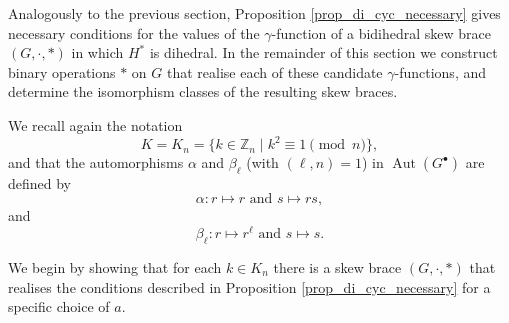\documentclass[reqno]{amsart}
\theoremstyle{definition}
\newcommand{\Z}{\mathbb{Z}}
\DeclareMathOperator{\Aut}{\mbox{Aut}}
\begin{document}
Analogously to the previous section, Proposition \ref{prop_di_cyc_necessary} gives necessary conditions for the values of the $ \gamma $-function of a bidihedral skew brace $ (G,\cdot,\ast) $ in which $ H^{\ast} $ is dihedral. In the remainder of this section we construct binary operations $ \ast $ on $ G $ that realise each of these candidate $ \gamma $-functions, and determine the isomorphism classes of the resulting skew braces. 

We recall again the notation 
\[ K = K_{n} = \{ k \in \Z_{n} \mid k^{2} \equiv 1 \pmod{n} \}, \]
and that the automorphisms $ \alpha $ and $ \beta_{\ell} $ (with $ (\ell,n)=1 $)  in $ \Aut(G^{\bullet}) $ are defined by 
\[ \alpha : r \mapsto r \mbox{ and } s \mapsto rs, \]
and 
\[ \beta_{\ell} : r \mapsto r^{\ell} \mbox{ and } s \mapsto s. \]

We begin by showing that for each $ k \in K_{n} $ there is a skew brace $ (G,\cdot,\ast) $ that realises the conditions described in Proposition \ref{prop_di_cyc_necessary} for a specific choice of $ a $. 
\end{document}
